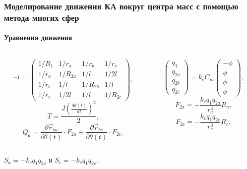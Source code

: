 \documentclass[10pt,pdf,hyperref={unicode}]{beamer}
\begin{document}
\begin{frame}
\frametitle{Моделирование движения КА вокруг центра масс с помощью метода многих сфер}
\framesubtitle{Уравнения движения}
\begin{columns}[onlytextwidth]
	\begin{column}{0.5\textwidth}
	\begin{equation*}
		[C_m]^{-1} = 
		\begin{pmatrix}
			1/R_1	&	1/r_a	&	1/r_b	&	1/r_c\\
			1/r_a	&	1/R_{2a}	&	1/l		&	1/2l\\
			1/r_b	&	1/l		&	1/R_{2b}	&	1/l\\
			1/r_c	&	1/2l		&	1/l		&	1/R_{2c}
		\end{pmatrix},
	\end{equation*}	
	\begin{equation*}
		T = \frac{J \left(\frac{d \theta (t)}{dt}\right)^2}{2},
	\end{equation*}
	\begin{equation*}
		Q_\theta = \frac{\partial \vec{r}_{ba}}{\partial \theta(t)} \cdot F_{2a} + \frac{\partial \vec{r}_{bc}}{\partial \theta(t)} \cdot F_{2c},
	\end{equation*}
	\end{column}
	\begin{column}{0.5\textwidth}
	\begin{equation*}
		\begin{pmatrix}
			q_1\\
			q_{2a}\\
			q_{2b}\\
			q_{2c}
		\end{pmatrix}
		= k_c C_m 
		\begin{pmatrix}
			-\phi\\
			\phi\\
			\phi\\
			\phi
		\end{pmatrix},
	\end{equation*}
	\begin{equation*}
		F_{2a} = - \frac{k_c q_1 q_{2a}}{r_a^3}  R_a,
	\end{equation*}
	\begin{equation*}
		F_{2c} = - \frac{k_c q_1 q_{2c}}{r_c^3} R_c,
	\end{equation*}
	\end{column}
\end{columns}
\begin{center}
$S_a = - k_c q_1 q_{2a}$ и $S_c = - k_c q_1 q_{2c}$.
\end{center}
\end{frame}
\end{document}
